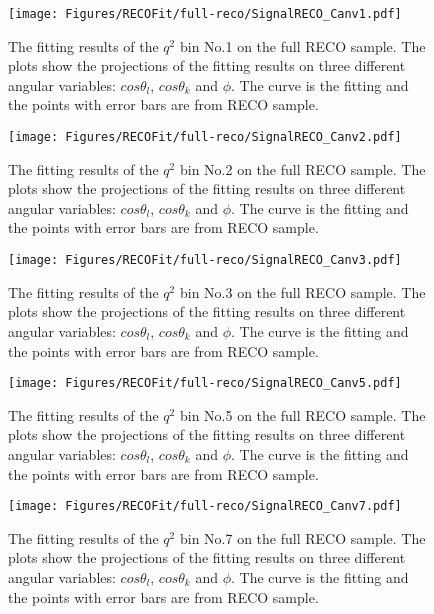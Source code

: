 \begin{figure}[!hbt]
  \centering
  \texttt{[image: Figures/RECOFit/full-reco/SignalRECO\_Canv1.pdf]}
  \caption{The fitting results of the $q^2$ bin No.1 on the full RECO
    sample. The plots show the projections of the fitting results on
    three different angular variables: $cos\theta_l$, $cos\theta_k$
    and $\phi$. The curve is the fitting and the points with error
    bars are from RECO sample. }
  \label{fig:fullreco-bin1}
\end{figure}

\begin{figure}[!hbt]
  \centering
  \texttt{[image: Figures/RECOFit/full-reco/SignalRECO\_Canv2.pdf]}
  \caption{The fitting results of the $q^2$ bin No.2 on the full RECO
    sample. The plots show the projections of the fitting results on
    three different angular variables: $cos\theta_l$, $cos\theta_k$
    and $\phi$. The curve is the fitting and the points with error
    bars are from RECO sample. }
  \label{fig:fullreco-bin2}
\end{figure}



\begin{figure}[!hbt]
  \centering
  \texttt{[image: Figures/RECOFit/full-reco/SignalRECO\_Canv3.pdf]}
  \caption{The fitting results of the $q^2$ bin No.3 on the full RECO
    sample. The plots show the projections of the fitting results on
    three different angular variables: $cos\theta_l$, $cos\theta_k$
    and $\phi$. The curve is the fitting and the points with error
    bars are from RECO sample. }
  \label{fig:fullreco-bin3}
\end{figure}



\begin{figure}[!hbt]
  \centering
  \texttt{[image: Figures/RECOFit/full-reco/SignalRECO\_Canv5.pdf]}
  \caption{The fitting results of the $q^2$ bin No.5 on the full RECO
    sample. The plots show the projections of the fitting results on
    three different angular variables: $cos\theta_l$, $cos\theta_k$
    and $\phi$. The curve is the fitting and the points with error
    bars are from RECO sample. }
  \label{fig:fullreco-bin5}
\end{figure}

\begin{figure}[!hbt]
  \centering
  \texttt{[image: Figures/RECOFit/full-reco/SignalRECO\_Canv7.pdf]}
  \caption{The fitting results of the $q^2$ bin No.7 on the full RECO
    sample. The plots show the projections of the fitting results on
    three different angular variables: $cos\theta_l$, $cos\theta_k$
    and $\phi$. The curve is the fitting and the points with error
    bars are from RECO sample. }
  \label{fig:fullreco-bin7}
\end{figure}



